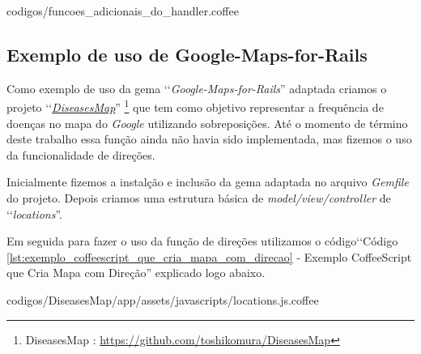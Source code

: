 
{codigos/funcoes_adicionais_do_handler.coffee}

\subsection{Exemplo de uso de Google-Maps-for-Rails}
\label{subsection:exemplo_de_uso_de_google-maps-for-rails}

Como exemplo de uso da gema ‘‘\emph{Google-Maps-for-Rails}'' adaptada criamos o projeto 
‘‘\emph{\href{https://github.com/toshikomura/DiseasesMap}{DiseasesMap}}'' 
\footnote{DiseasesMap : \url{https://github.com/toshikomura/DiseasesMap}} que tem como objetivo representar 
a frequência de doenças no mapa do \emph{Google} utilizando sobreposições. Até o momento de término deste
trabalho essa função ainda não havia sido implementada, mas fizemos o uso da funcionalidade de direções.

Inicialmente fizemos a instalção e inclusão da gema adaptada no arquivo \emph{Gemfile} do projeto. Depois 
criamos uma estrutura básica de \emph{model/view/controller} de ‘‘\emph{locations}''. 

Em seguida para fazer o uso da função de direções utilizamos o código‘‘Código 
\ref{lst:exemplo_coffeescript_que_cria_mapa_com_direcao} - Exemplo CoffeeScript que Cria Mapa com 
Direção'' explicado logo abaixo.


{codigos/DiseasesMap/app/assets/javascripts/locations.js.coffee}

